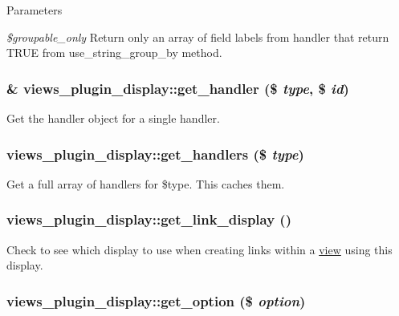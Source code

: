 \begin{DoxyParams}{Parameters}
\item[{\em \$groupable\_\-only}]Return only an array of field labels from handler that return TRUE from use\_\-string\_\-group\_\-by method. \end{DoxyParams}
\hypertarget{classviews__plugin__display_af76b2461cd87d7965a442bae077aa772}{
\subsubsection[{get\_\-handler}]{\setlength{\rightskip}{0pt plus 5cm}\& views\_\-plugin\_\-display::get\_\-handler (\$ {\em type}, \/  \$ {\em id})}}
\label{classviews__plugin__display_af76b2461cd87d7965a442bae077aa772}
Get the handler object for a single handler. \hypertarget{classviews__plugin__display_a8ca4ff604c846359bfce009a75a264be}{
\subsubsection[{get\_\-handlers}]{\setlength{\rightskip}{0pt plus 5cm}views\_\-plugin\_\-display::get\_\-handlers (\$ {\em type})}}
\label{classviews__plugin__display_a8ca4ff604c846359bfce009a75a264be}
Get a full array of handlers for \$type. This caches them. \hypertarget{classviews__plugin__display_a97a467c1f9faecd9f1ca60f83e1193d2}{
\subsubsection[{get\_\-link\_\-display}]{\setlength{\rightskip}{0pt plus 5cm}views\_\-plugin\_\-display::get\_\-link\_\-display ()}}
\label{classviews__plugin__display_a97a467c1f9faecd9f1ca60f83e1193d2}
Check to see which display to use when creating links within a \hyperlink{classview}{view} using this display. \hypertarget{classviews__plugin__display_ad2a856f65cb78867204d4f7f877b2972}{
\subsubsection[{get\_\-option}]{\setlength{\rightskip}{0pt plus 5cm}views\_\-plugin\_\-display::get\_\-option (\$ {\em option})}}
